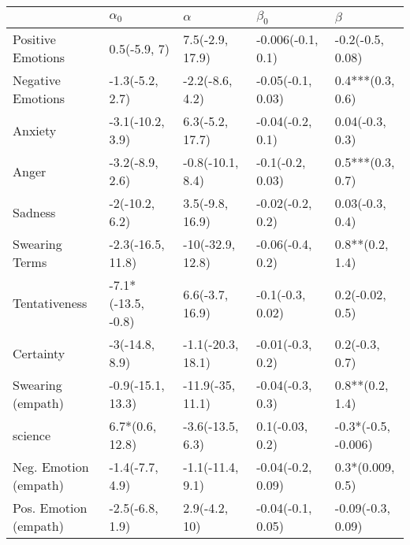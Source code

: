 \begin{tabular}{lllll}
\toprule
{} &          $\alpha_0$ &           $\alpha$ &          $\beta_0$ &              $\beta$ \\
\midrule
Positive Emotions     &        0.5(-5.9, 7) &    7.5(-2.9, 17.9) &  -0.006(-0.1, 0.1) &     -0.2(-0.5, 0.08) \\
Negative Emotions     &     -1.3(-5.2, 2.7) &    -2.2(-8.6, 4.2) &  -0.05(-0.1, 0.03) &     0.4***(0.3, 0.6) \\
Anxiety               &    -3.1(-10.2, 3.9) &    6.3(-5.2, 17.7) &   -0.04(-0.2, 0.1) &      0.04(-0.3, 0.3) \\
Anger                 &     -3.2(-8.9, 2.6) &   -0.8(-10.1, 8.4) &   -0.1(-0.2, 0.03) &     0.5***(0.3, 0.7) \\
Sadness               &      -2(-10.2, 6.2) &    3.5(-9.8, 16.9) &   -0.02(-0.2, 0.2) &      0.03(-0.3, 0.4) \\
Swearing Terms        &   -2.3(-16.5, 11.8) &   -10(-32.9, 12.8) &   -0.06(-0.4, 0.2) &      0.8**(0.2, 1.4) \\
Tentativeness         &  -7.1*(-13.5, -0.8) &    6.6(-3.7, 16.9) &   -0.1(-0.3, 0.02) &      0.2(-0.02, 0.5) \\
Certainty             &      -3(-14.8, 8.9) &  -1.1(-20.3, 18.1) &   -0.01(-0.3, 0.2) &       0.2(-0.3, 0.7) \\
Swearing (empath)     &   -0.9(-15.1, 13.3) &   -11.9(-35, 11.1) &   -0.04(-0.3, 0.3) &      0.8**(0.2, 1.4) \\
science               &     6.7*(0.6, 12.8) &   -3.6(-13.5, 6.3) &    0.1(-0.03, 0.2) &  -0.3*(-0.5, -0.006) \\
Neg. Emotion (empath) &     -1.4(-7.7, 4.9) &   -1.1(-11.4, 9.1) &  -0.04(-0.2, 0.09) &     0.3*(0.009, 0.5) \\
Pos. Emotion (empath) &     -2.5(-6.8, 1.9) &      2.9(-4.2, 10) &  -0.04(-0.1, 0.05) &    -0.09(-0.3, 0.09) \\
\bottomrule
\end{tabular}
